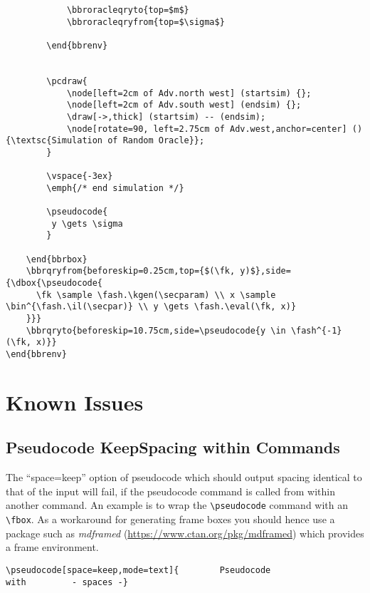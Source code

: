 \documentclass[a4paper]{report}
\begin{document}
\begin{lstlisting}
			\bbroracleqryto{top=$m$}
			\bbroracleqryfrom{top=$\sigma$}			

		\end{bbrenv}
		
	
		\pcdraw{
			\node[left=2cm of Adv.north west] (startsim) {};
			\node[left=2cm of Adv.south west] (endsim) {};			
			\draw[->,thick] (startsim) -- (endsim);
			\node[rotate=90, left=2.75cm of Adv.west,anchor=center] () {\textsc{Simulation of Random Oracle}};
		}
		
		\vspace{-3ex}
		\emph{/* end simulation */}
		
		\pseudocode{
		 y \gets \sigma
		}

	\end{bbrbox}
	\bbrqryfrom{beforeskip=0.25cm,top={$(\fk, y)$},side={\dbox{\pseudocode{
	  \fk \sample \fash.\kgen(\secparam) \\ x \sample \bin^{\fash.\il(\secpar)} \\ y \gets \fash.\eval(\fk, x)} 
	}}}
	\bbrqryto{beforeskip=10.75cm,side=\pseudocode{y \in \fash^{-1}(\fk, x)}}
\end{bbrenv}
\end{lstlisting}


\chapter{Known Issues}

\section{Pseudocode KeepSpacing within Commands}
\label{sec:keepindent-problem}
The \enquote{space=keep} option of pseudocode which should output spacing identical to that of the input 
will fail, if the pseudocode command is called from within another command. An example is to
wrap the \lstinline$\pseudocode$ command with an \lstinline$\fbox$. As a workaround for generating frame boxes you should hence
use a package such as \emph{mdframed} (\url{https://www.ctan.org/pkg/mdframed}) which provides a frame environment.

\begin{mdframed}
\end{mdframed}
\begin{lstlisting}
\pseudocode[space=keep,mode=text]{        Pseudocode                with         - spaces -}
\end{lstlisting}
\end{document}
